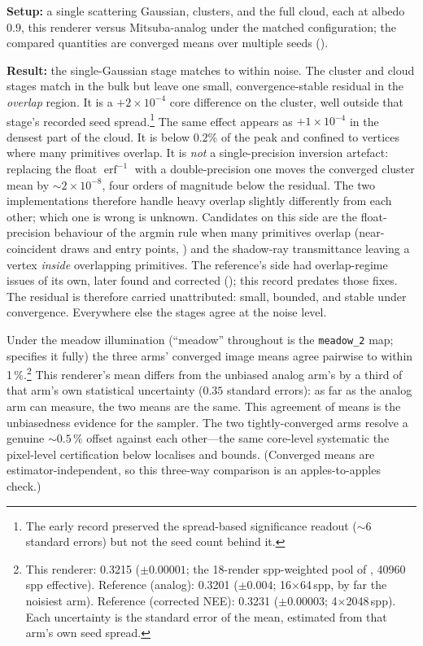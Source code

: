 \textbf{Setup:} a single
scattering Gaussian, clusters, and the full cloud, each at albedo $0.9$, this renderer versus
Mitsuba-analog under the matched configuration; the compared quantities are converged means over
multiple seeds ().

\textbf{Result:} the single-Gaussian stage
matches to within noise. The cluster and cloud stages match in the bulk but leave one small,
convergence-stable residual in the \emph{overlap} region. It is a $+2\times10^{-4}$ core difference on the
cluster, well outside that stage's recorded seed spread.\footnote{The early record preserved
the spread-based significance readout (${\sim}6$ standard errors) but not the seed count
behind it.} The same effect appears as ${+}1\times10^{-4}$ in the densest part of the cloud.
It is below $0.2\%$ of the peak and confined to vertices where many primitives overlap. It is \emph{not} a single-precision inversion artefact: replacing the float
$\operatorname{erf}^{-1}$ with a double-precision one moves the converged cluster mean by
${\sim}2\times10^{-8}$, four orders of magnitude below the residual. The two implementations therefore handle heavy overlap slightly differently from each other;
which one is wrong is unknown. Candidates on this side are the float-precision behaviour of the argmin rule when
many primitives overlap (near-coincident draws and entry points, ) and the
shadow-ray transmittance leaving a vertex \emph{inside} overlapping primitives. The
reference's side had overlap-regime issues of its own, later found and corrected
(); this record predates those fixes. The residual is therefore
carried unattributed: small, bounded, and stable under convergence. Everywhere else the
stages agree at the noise level.

Under the meadow illumination (``meadow'' throughout is the \texttt{meadow\_2} map;
 specifies it fully) the three arms' converged image means agree pairwise to within \num{1}\,\%.\footnote{This renderer: \num{0.3215} ($\pm\num{0.00001}$; the \num{18}-render
spp-weighted pool of , \num{40960}\,spp effective). Reference (analog):
\num{0.3201} ($\pm\num{0.004}$; \num{16}$\times$\num{64}\,spp, by far the noisiest arm).
Reference (corrected NEE): \num{0.3231} ($\pm\num{0.00003}$; \num{4}$\times$\num{2048}\,spp).
Each uncertainty is the standard error of the mean, estimated from that arm's own seed
spread.} This renderer's mean differs from the unbiased analog arm's by a third of that arm's
own statistical uncertainty ($0.35$ standard errors): as far as the analog arm can measure,
the two means are the same. This agreement of means is the unbiasedness evidence for the sampler. The two
tightly-converged arms resolve a genuine ${\sim}0.5\,\%$ offset against each other---the same
core-level systematic the pixel-level certification below localises and bounds. (Converged
means are estimator-independent, so this three-way comparison is an apples-to-apples check.)

